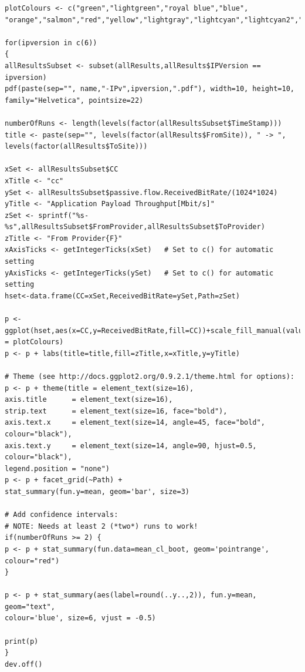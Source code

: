 \documentclass[a4paper,12pt]{ctexbook}
\begin{document}
\begin{flushleft}
\begin{verbatim}
plotColours <- c("green","lightgreen","royal blue","blue", "orange","salmon","red","yellow","lightgray","lightcyan","lightcyan2","lightcyan3","lightcyan4","orchid","orchid1","orchid2","orchid3","orchid4")

for(ipversion in c(6))
{
allResultsSubset <- subset(allResults,allResults$IPVersion == ipversion)
pdf(paste(sep="", name,"-IPv",ipversion,".pdf"), width=10, height=10, family="Helvetica", pointsize=22)

numberOfRuns <- length(levels(factor(allResultsSubset$TimeStamp)))
title <- paste(sep="", levels(factor(allResults$FromSite)), " -> ", levels(factor(allResults$ToSite)))

xSet <- allResultsSubset$CC
xTitle <- "cc"
ySet <- allResultsSubset$passive.flow.ReceivedBitRate/(1024*1024)
yTitle <- "Application Payload Throughput[Mbit/s]"
zSet <- sprintf("%s-%s",allResultsSubset$FromProvider,allResultsSubset$ToProvider)
zTitle <- "From Provider{F}"
xAxisTicks <- getIntegerTicks(xSet)   # Set to c() for automatic setting
yAxisTicks <- getIntegerTicks(ySet)   # Set to c() for automatic setting
hset<-data.frame(CC=xSet,ReceivedBitRate=ySet,Path=zSet)

p <- ggplot(hset,aes(x=CC,y=ReceivedBitRate,fill=CC))+scale_fill_manual(values = plotColours)
p <- p + labs(title=title,fill=zTitle,x=xTitle,y=yTitle)

# Theme (see http://docs.ggplot2.org/0.9.2.1/theme.html for options):
p <- p + theme(title = element_text(size=16),
axis.title      = element_text(size=16),
strip.text      = element_text(size=16, face="bold"),
axis.text.x     = element_text(size=14, angle=45, face="bold", colour="black"),
axis.text.y     = element_text(size=14, angle=90, hjust=0.5, colour="black"),
legend.position = "none")
p <- p + facet_grid(~Path) + 
stat_summary(fun.y=mean, geom='bar', size=3)

# Add confidence intervals:
# NOTE: Needs at least 2 (*two*) runs to work!
if(numberOfRuns >= 2) {
p <- p + stat_summary(fun.data=mean_cl_boot, geom='pointrange', colour="red")
}

p <- p + stat_summary(aes(label=round(..y..,2)), fun.y=mean, geom="text",
colour='blue', size=6, vjust = -0.5)

print(p)
}
dev.off()
\end{verbatim}


\end{flushleft}
\end{document}
